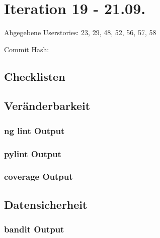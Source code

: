 \section{Iteration 19 - 21.09.}
	Abgegebene Userstories: 23, 29, 48, 52, 56, 57, 58
	
	Commit Hash: 
	
	\subsection*{Checklisten}
	
	
	
	
	
	

	\subsection*{Veränderbarkeit}
	\subsubsection*{ng lint Output}
	

	\subsubsection*{pylint Output}
	

	\subsubsection*{coverage Output}
	

	\subsection*{Datensicherheit}

	\subsubsection*{bandit Output}
	
